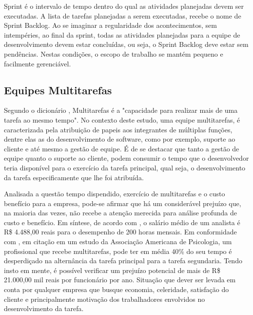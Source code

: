 Sprint é o intervalo de tempo dentro do qual as atividades planejadas devem ser executadas. A lista de tarefas planejadas a serem executadas, recebe o nome de Sprint Backlog. Ao se imaginar a regularidade dos acontecimentos, sem intempéries, ao final da sprint, todas as atividades planejadas para a equipe de desenvolvimento devem estar concluídas, ou seja, o Sprint Backlog deve estar sem pendências. Nestas condições, o escopo de trabalho se mantém pequeno e facilmente gerenciável.

\subsection{Equipes Multitarefas}
Segundo o dicionário \cite{diciomultitarefas}, Multitarefas é a "capacidade para realizar mais de uma tarefa ao mesmo tempo". No contexto deste estudo, uma equipe multitarefas, é caracterizada pela atribuição de papeis aos integrantes de múltiplas funções, dentre elas as do desenvolvimento de software, como por exemplo, suporte ao cliente e até mesmo a gestão de equipe. É de se destacar que tanto a gestão de equipe quanto o suporte ao cliente, podem consumir o tempo que o desenvolvedor teria disponível para o exercício da tarefa principal, qual seja, o desenvolvimento da tarefa especificamente  que lhe foi atribuída. \par
Analisada a questão tempo dispendido, exercício de multitarefas e o custo benefício para a empresa, pode-se afirmar que há um considerável prejuízo que, na maioria das vezes, não recebe a atenção merecida para análise profunda de custo e benefício. Em síntese, de acordo com , o salário médio de um analista é R\$ 4.488,00 reais para o desempenho de 200 horas mensais. Em conformidade com , em citação em um estudo da Associação Americana de Psicologia, um profissional que recebe multitarefas, pode ter em média 40\% do seu tempo é desperdiçado na alternância da tarefa principal para a tarefa segundaria. Tendo insto em mente, é possível verificar um prejuízo potencial de mais de R\$ 21.000,00 mil reais por funcionário por ano. Situação que dever ser levada em conta por qualquer empresa que busque economia, celeridade, satisfação do cliente e principalmente motivação dos trabalhadores envolvidos no desenvolvimento da tarefa.

